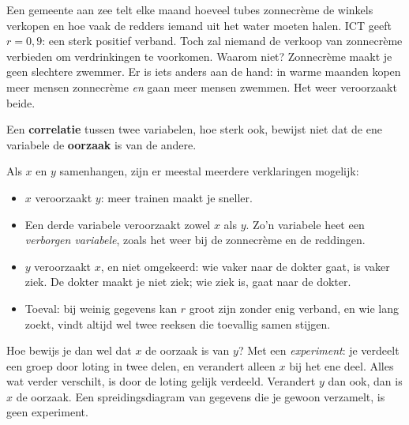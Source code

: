 Een gemeente aan zee telt elke maand hoeveel tubes zonnecrème de winkels verkopen en hoe vaak de redders iemand uit het water moeten halen. ICT geeft $r = 0,9$: een sterk positief verband. Toch zal niemand de verkoop van zonnecrème verbieden om verdrinkingen te voorkomen. Waarom niet? Zonnecrème maakt je geen slechtere zwemmer. Er is iets anders aan de hand: in warme maanden kopen meer mensen zonnecrème \textit{en} gaan meer mensen zwemmen. Het weer veroorzaakt beide.

\begin{theorie}
Een \textbf{\textcolor{accent}{correlatie}} tussen twee variabelen, hoe sterk ook, bewijst niet dat de ene variabele de \textbf{\textcolor{accent}{oorzaak}} is van de andere.
\end{theorie}

Als $x$ en $y$ samenhangen, zijn er meestal meerdere verklaringen mogelijk:
\begin{itemize}
\item $x$ veroorzaakt $y$: meer trainen maakt je sneller.
\item Een derde variabele veroorzaakt zowel $x$ als $y$. Zo'n variabele heet een \emph{verborgen variabele}, zoals het weer bij de zonnecrème en de reddingen.
\item $y$ veroorzaakt $x$, en niet omgekeerd: wie vaker naar de dokter gaat, is vaker ziek. De dokter maakt je niet ziek; wie ziek is, gaat naar de dokter.
\item Toeval: bij weinig gegevens kan $r$ groot zijn zonder enig verband, en wie lang zoekt, vindt altijd wel twee reeksen die toevallig samen stijgen.
\end{itemize}

Hoe bewijs je dan wel dat $x$ de oorzaak is van $y$? Met een \textit{experiment}: je verdeelt een groep door loting in twee delen, en verandert alleen $x$ bij het ene deel. Alles wat verder verschilt, is door de loting gelijk verdeeld. Verandert $y$ dan ook, dan is $x$ de oorzaak. Een spreidingsdiagram van gegevens die je gewoon verzamelt, is geen experiment.


